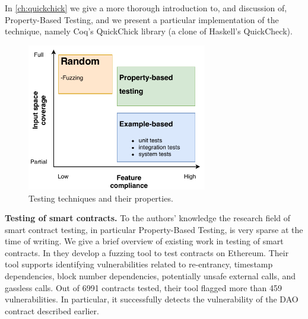 \documentclass[twoside,11pt,openright]{report}
\newcommand{\pbt}{Property-Based Testing}
\begin{document}
In \autoref{ch:quickchick} we give a more thorough introduction to, and discussion of, \pbt{}, and we present a particular implementation of the technique, namely Coq's QuickChick library (a clone of Haskell's QuickCheck).\medskip\\
\begin{figure}[H]
\begin{center}
\includegraphics[width=0.7\textwidth]{media/Testing-diagram.pdf}
\end{center}
\caption[A diagram of different automated testing techniques showing input space coverage versus feature compliance]{Testing techniques and their properties.}
\label{fig:testing-techniques-diagram}
\end{figure}
\textbf{Testing of smart contracts.} 
 To the authors' knowledge the research field of smart contract testing, in particular \pbt{}, is very sparse at the time of writing. We give a brief overview of existing work in testing of smart contracts. In \cite{contractfuzzing} they develop a fuzzing tool to test contracts on Ethereum. Their tool supports identifying vulnerabilities related to re-entrancy, timestamp dependencies, block number dependencies, potentially unsafe external calls, and gassless calls. Out of 6991 contracts tested, their tool flagged more than 459 vulnerabilities. In particular, it successfully detects the vulnerability of the DAO contract described earlier.
\end{document}
